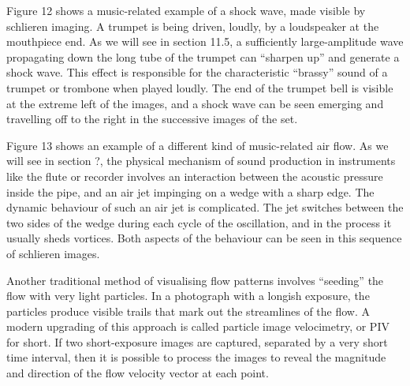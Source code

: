
  Figure 12 shows a music-related example of a shock wave, made visible by 
  schlieren imaging. A trumpet is being driven, loudly, by a loudspeaker at the 
  mouthpiece end. As we will see in section 11.5, a sufficiently 
  large-amplitude wave propagating down the long tube of the trumpet can 
  “sharpen up” and generate a shock wave. This effect is responsible for the 
  characteristic “brassy” sound of a trumpet or trombone when played loudly. 
  The end of the trumpet bell is visible at the extreme left of the images, and 
  a shock wave can be seen emerging and travelling off to the right in the 
  successive images of the set. 


  Figure 13 shows an example of a different kind of music-related air flow. As 
  we will see in section ?, the physical mechanism of sound production in 
  instruments like the flute or recorder involves an interaction between the 
  acoustic pressure inside the pipe, and an air jet impinging on a wedge with a 
  sharp edge. The dynamic behaviour of such an air jet is complicated. The jet 
  switches between the two sides of the wedge during each cycle of the 
  oscillation, and in the process it usually sheds vortices. Both aspects of 
  the behaviour can be seen in this sequence of schlieren images. 


  Another traditional method of visualising flow patterns involves “seeding” 
  the flow with very light particles. In a photograph with a longish exposure, 
  the particles produce visible trails that mark out the streamlines of the 
  flow. A modern upgrading of this approach is called particle image 
  velocimetry, or PIV for short. If two short-exposure images are captured, 
  separated by a very short time interval, then it is possible to process the 
  images to reveal the magnitude and direction of the flow velocity vector at 
  each point. 

